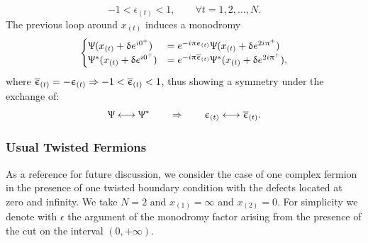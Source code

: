 \begin{equation}
  -1 < \epsilon_{(t)} < 1, \qquad \forall t = 1, 2, \dots, N.
\end{equation}
The previous loop around $x_{(t)}$ induces a monodromy 
\begin{equation}
  \begin{cases}
    \Uppsi( x_{(t)} + \updelta e^{i 0^+} )
    & =
    e^{-i \uppi \upepsilon_{(t)}} \Uppsi( x_{(t)} + \updelta e^{2 i \uppi^+} )
    \\
    \Uppsi^*( x_{(t)} + \updelta e^{i 0^+} )
    & =
    e^{-i \uppi \overline{\upepsilon}_{(t)}} \Uppsi^*( x_{(t)} + \updelta e^{2 i \uppi^+} ),
  \end{cases}
  \label{eq:monodromy-factors}
\end{equation}
where $\overline{\upepsilon}_{(t)} =  - \upepsilon_{(t)} \Rightarrow -1 < \overline{\upepsilon}_{(t)} < 1$, thus showing a symmetry under the exchange of:
\begin{equation}
  \Uppsi \longleftrightarrow \Uppsi^*
  \qquad \Rightarrow \qquad
  \upepsilon_{(t)} \longleftrightarrow \overline{\upepsilon}_{(t)}.
\end{equation}


\subsubsection{Usual Twisted Fermions}
\label{sec:usual-twisted-fermion}

As a reference for future discussion, we consider the case of one complex fermion in the presence of one twisted boundary condition with the defects located at zero and infinity.
We take $N = 2$ and $x_{(1)} = \infty$ and $x_{(2)} = 0$.
For simplicity we denote with $\epsilon$ the argument of the monodromy factor arising from the presence of the cut on the interval $( 0, +\infty)$.

